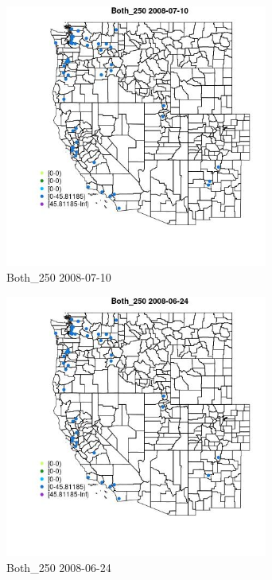 \begin{figure} 
\centering  
\includegraphics[width=0.77\textwidth]{Code_Outputs/Report_ML_input_PM25_Step4_part_e_de_duplicated_aves_MapObsBoth_2502008-07-10.jpg} 
\caption{\label{fig:Report_ML_input_PM25_Step4_part_e_de_duplicated_avesMapObsBoth_2502008-07-10}Both_250 2008-07-10} 
\end{figure} 
 

\begin{figure} 
\centering  
\includegraphics[width=0.77\textwidth]{Code_Outputs/Report_ML_input_PM25_Step4_part_e_de_duplicated_aves_MapObsBoth_2502008-06-24.jpg} 
\caption{\label{fig:Report_ML_input_PM25_Step4_part_e_de_duplicated_avesMapObsBoth_2502008-06-24}Both_250 2008-06-24} 
\end{figure} 
 

